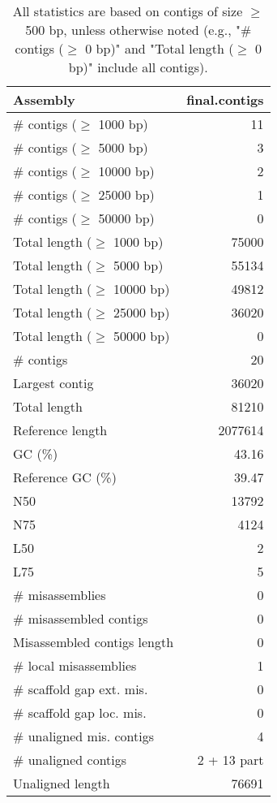 \documentclass[12pt,a4paper]{article}
\begin{document}
\begin{table}[ht]
\begin{center}
\caption{All statistics are based on contigs of size $\geq$ 500 bp, unless otherwise noted (e.g., "\# contigs ($\geq$ 0 bp)" and "Total length ($\geq$ 0 bp)" include all contigs).}
\begin{tabular}{|l*{1}{|r}|}
\hline
Assembly & final.contigs \\ \hline
\# contigs ($\geq$ 1000 bp) & 11 \\ \hline
\# contigs ($\geq$ 5000 bp) & 3 \\ \hline
\# contigs ($\geq$ 10000 bp) & 2 \\ \hline
\# contigs ($\geq$ 25000 bp) & 1 \\ \hline
\# contigs ($\geq$ 50000 bp) & 0 \\ \hline
Total length ($\geq$ 1000 bp) & 75000 \\ \hline
Total length ($\geq$ 5000 bp) & 55134 \\ \hline
Total length ($\geq$ 10000 bp) & 49812 \\ \hline
Total length ($\geq$ 25000 bp) & 36020 \\ \hline
Total length ($\geq$ 50000 bp) & 0 \\ \hline
\# contigs & 20 \\ \hline
Largest contig & 36020 \\ \hline
Total length & 81210 \\ \hline
Reference length & 2077614 \\ \hline
GC (\%) & 43.16 \\ \hline
Reference GC (\%) & 39.47 \\ \hline
N50 & 13792 \\ \hline
N75 & 4124 \\ \hline
L50 & 2 \\ \hline
L75 & 5 \\ \hline
\# misassemblies & 0 \\ \hline
\# misassembled contigs & 0 \\ \hline
Misassembled contigs length & 0 \\ \hline
\# local misassemblies & 1 \\ \hline
\# scaffold gap ext. mis. & 0 \\ \hline
\# scaffold gap loc. mis. & 0 \\ \hline
\# unaligned mis. contigs & 4 \\ \hline
\# unaligned contigs & 2 + 13 part \\ \hline
Unaligned length & 76691 \\ \hline

\end{tabular}
\end{center}
\end{table}
\end{document}

